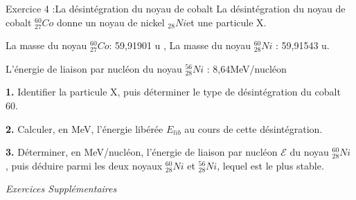 \documentclass[12pt, french]{article}
\begin{document}
\begin{Box2}{Exercice 4 :La désintégration du noyau de cobalt }
La désintégration du noyau de cobalt $^{60}_{27}Co$ donne un noyau de nickel $_{28}Ni$et une particule X.

La masse du noyau $^{60}_{27}Co$: 59,91901 u , La masse du noyau $^{60}_{28}Ni$ : 59,91543 u.

L’énergie de liaison par nucléon du noyau $^{56}_{28}Ni$ : 8,64MeV/nucléon

\textbf{1. }Identifier la particule X, puis déterminer le type de désintégration du cobalt 60.

\textbf{2. } Calculer, en MeV, l’énergie libérée $E_{lib}$ au cours de cette désintégration.

\textbf{3. }Déterminer, en MeV/nucléon, l’énergie de liaison par nucléon $\mathscr{E}$ du noyau $^{60}_{28}Ni$ , puis déduire parmi les deux noyaux $^{60}_{28}Ni$ et $^{56}_{28}Ni$, lequel est le plus stable.

\end{Box2}

\begin{center}
   \Large{ \em{Exercices Supplémentaires}}
\end{center}
\end{document}
